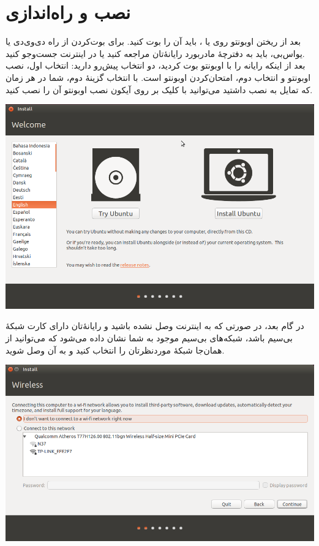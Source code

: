 \section{نصب و راه‌اندازی}
بعد از ریختن اوبونتو روی  یا ، باید آن را بوت کنید. برای بوت‌کردن از راه دی‌وی‌دی یا یواس‌بی، باید به دفترچهٔ مادربورد رایانهٔ‌تان مراجعه کنید یا در اینترنت جست‌وجو کنید.\\
بعد از اینکه رایانه را با اوبونتو بوت کردید، دو انتخاب پیش‌رو دارید: انتخاب اول، نصب اوبونتو و انتخاب دوم، امتحان‌کردن اوبونتو است. با انتخاب گزینهٔ دوم، شما در هر زمان که تمایل به نصب داشتید می‌توانید با کلیک بر روی آیکون نصب اوبونتو آن را نصب کنید.
\begin{center}
\includegraphics[scale=0.47]{pics/3.png}\\
\end{center}
در گام بعد، در صورتی که به اینترنت وصل نشده باشید و رایانهٔ‌تان دارای کارت شبکهٔ بی‌سیم باشد، شبکه‌های بی‌سیم موجود به شما نشان داده می‌شود که می‌توانید از همان‌جا شبکهٔ موردنظرتان را انتخاب کنید و به آن وصل شوید.
\begin{center}
\includegraphics[scale=0.47]{pics/4.png}\\
\end{center}

